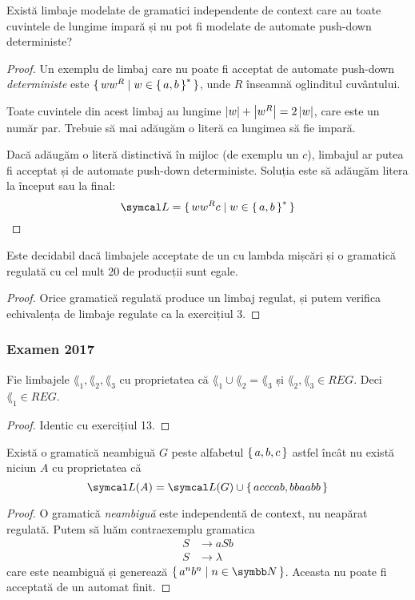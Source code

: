 \begin{exercise}
    Există limbaje modelate de gramatici independente de context care au toate cuvintele de lungime impară și nu pot fi modelate de automate push-down deterministe?
\end{exercise}
\begin{proof}
    Un exemplu de limbaj care nu poate fi acceptat de automate push-down \emph{deterministe} este \(\set{ w w^R | w \in \set{a, b}^* }\), unde \(R\) înseamnă oglinditul cuvântului.

    Toate cuvintele din acest limbaj au lungime \(\left\lvert w\right\rvert + \left\lvert w^R\right\rvert = 2 \left\lvert w\right\rvert\), care este un număr par. Trebuie să mai adăugăm o literă ca lungimea să fie impară.

    Dacă adăugăm o literă distinctivă în mijloc (de exemplu un \(c\)), limbajul ar putea fi acceptat și de automate push-down deterministe. Soluția este să adăugăm litera la început sau la final:
    \[\lang = \set{ w w^R c | w \in \set{a, b}^* }\]
\end{proof}

\begin{exercise}
    Este decidabil dacă limbajele acceptate de un \nfa{} cu lambda mișcări și o gramatică regulată cu cel mult 20 de producții sunt egale.
\end{exercise}
\begin{proof}
    Orice gramatică regulată produce un limbaj regulat, și putem verifica echivalența de limbaje regulate ca la exercițiul 3.
\end{proof}

\subsubsection*{Examen 2017}

\begin{exercise}
    Fie limbajele \(\lang_1, \lang_2, \lang_3\) cu proprietatea că \(\lang_1 \cup \lang_2 = \lang_3\) și \(\lang_2, \lang_3 \in REG\). Deci \(\lang_1 \in REG\).
\end{exercise}
\begin{proof}
    Identic cu exercițiul 13.
\end{proof}

\begin{exercise}
    Există o gramatică neambiguă \(G\) peste alfabetul \(\set{ a, b, c }\) astfel încât nu există niciun \nfa{} \(A\) cu proprietatea că
    \[\lang(A) = \lang(G) \cup \set{ acccab, bbaabb }\]
\end{exercise}
\begin{proof}
    O gramatică \emph{neambiguă} este independentă de context, nu neapărat regulată. Putem să luăm contraexemplu gramatica
    \begin{align*}
        S & \rightarrow aSb     \\
        S & \rightarrow \lambda
    \end{align*}
    care este neambiguă și generează \(\set{ a^n b^n | n \in \naturals }\). Aceasta nu poate fi acceptată de un automat finit.
\end{proof}

